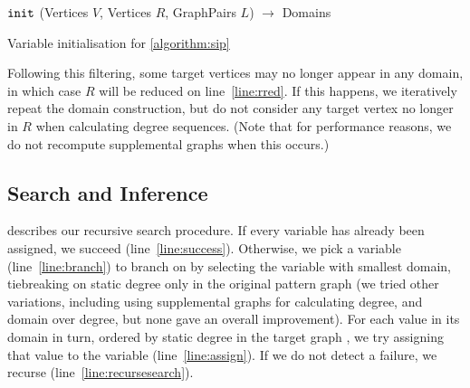 \documentclass{llncs}
\newcommand{\lineref}[1]{line~\ref{#1}}
\begin{document}
\begin{algorithm}[h]
\DontPrintSemicolon
\nl $\FuncSty{init}$ (Vertices $V$, Vertices $R$, GraphPairs $L$) $\rightarrow$ Domains \;
\nl {}
\caption{Variable initialisation for \cref{algorithm:sip}}
\label{algorithm:init}
\end{algorithm}

Following this filtering, some target vertices may no longer appear in any domain, in which case $R$
will be reduced on \lineref{line:rred}. If this happens, we iteratively repeat the domain
construction, but do not consider any target vertex no longer in $R$ when calculating degree
sequences. (Note that for performance reasons, we do not recompute supplemental graphs when this
occurs.)

\subsection{Search and Inference}

 describes our recursive search procedure. If every variable has already been
assigned, we succeed (\lineref{line:success}). Otherwise, we pick a variable (\lineref{line:branch})
to branch on by selecting the variable with smallest domain, tiebreaking on static degree only in
the original pattern graph (we tried other variations, including using supplemental graphs for
calculating degree, and domain over degree, but none gave an overall improvement).  For each value
in its domain in turn, ordered by static degree in the target graph \cite{Geelen:1992}, we try
assigning that value to the variable (\lineref{line:assign}). If we do not detect a failure, we
recurse (\lineref{line:recursesearch}).
\end{document}

